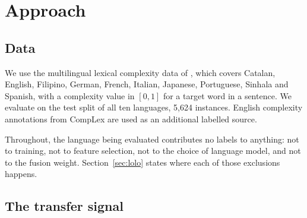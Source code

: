 %
%
\section{Approach}
\label{sec:approach}

\subsection{Data}
\label{sec:data}

We use the multilingual lexical complexity data of
\citet{shardlow-etal-2024-bea}, which covers Catalan, English, Filipino,
German, French, Italian, Japanese, Portuguese, Sinhala and Spanish, with
a complexity value in $[0,1]$ for a target word in a sentence. We
evaluate on the test split of all ten languages, 5{,}624 instances.
English complexity annotations from CompLex
\citep{shardlow-etal-2021-semeval} are used as an additional labelled
source.

Throughout, the language being evaluated contributes no labels to
anything: not to training, not to feature selection, not to the choice
of language model, and not to the fusion weight. Section~\ref{sec:lolo}
states where each of those exclusions happens.

\subsection{The transfer signal}
\label{sec:signalA}


